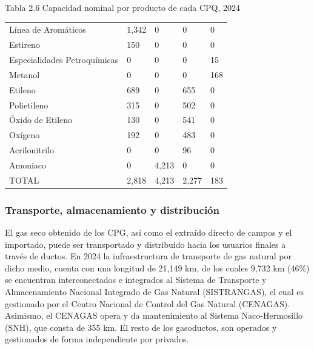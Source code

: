 \documentclass{sener2025}
\begin{document}
\begin{tabladoradoCorto}
  \caption{Tabla 2.6 Capacidad nominal por producto de cada CPQ, 2024}
  \label{tab:tabla_2_6_capacidad_nominal_po}
  \begin{tabularx}{\textwidth}{Vvvvv}
    \toprule
      &  &  &  &  \\
    \midrule
    Línea de Aromáticos & 1,342 & 0 & 0 & 0 \\
    Estireno & 150 & 0 & 0 & 0 \\
    Especialidades Petroquímicas & 0 & 0 & 0 & 15 \\
    Metanol & 0 & 0 & 0 & 168 \\
    Etileno & 689 & 0 & 655 & 0 \\
    Polietileno & 315 & 0 & 502 & 0 \\
    Óxido de Etileno & 130 & 0 & 541 & 0 \\
    Oxígeno & 192 & 0 & 483 & 0 \\
    Acrilonitrilo & 0 & 0 & 96 & 0 \\
    Amoniaco & 0 & 4,213 & 0 & 0 \\
    TOTAL & 2,818 & 4,213 & 2,277 & 183 \\
    \bottomrule
  \end{tabularx}
\end{tabladoradoCorto}
\vspace{-4pt}



\subsubsection{Transporte, almacenamiento y distribución}

El gas seco obtenido de los CPG, así como el extraído directo de campos y el importado, puede ser transportado y distribuido hacia los usuarios finales a través de ductos. En 2024 la infraestructura de transporte de gas natural por dicho medio, cuenta con una longitud de 21,149 km, de los cuales 9,732 km (46\%) se encuentran interconectados e integrados al Sistema de Transporte y Almacenamiento Nacional Integrado de Gas Natural (SISTRANGAS), el cual es gestionado por el Centro Nacional de Control del Gas Natural (CENAGAS). Asimismo, el CENAGAS opera y da mantenimiento al Sistema Naco-Hermosillo (SNH), que consta de 355 km. El resto de los gasoductos, son operados y gestionados de forma independiente por privados.
\end{document}
